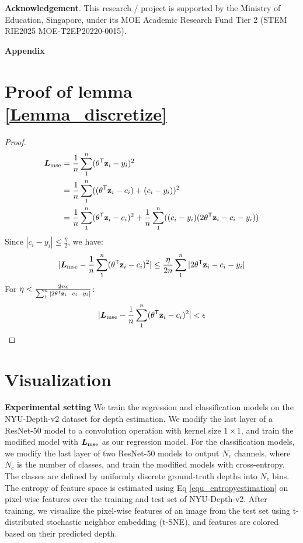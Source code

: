 \documentclass{article} %
\begin{document}
\textbf{Acknowledgement}. This research / project is supported by the Ministry of Education, Singapore, under its MOE Academic Research Fund Tier 2 (STEM RIE2025 MOE-T2EP20220-0015).




\newpage

\renewcommand\thefigure{\Alph{figure}} 
\setcounter{figure}{0}

\textbf{Appendix}
\appendix
\section{Proof of lemma \ref{Lemma_discretize}}
\label{appendix_A}

\begin{proof}
    \begin{align*}
    {\bm{L}}_{\text{mse}} 
    &= \frac{1}{n} \sum_{1}^{n}({\theta}^{{\sf T}}{\bf z}_i - y_i)^{2} \\
    &= \frac{1}{n} \sum_{1}^{n}(({\theta}^{{\sf T}}{\bf z}_i -c_i) + (c_i - y_i))^{2} \\
    &= \frac{1}{n} \sum_{1}^{n}({\theta}^{{\sf T}}{\bf z}_i -c_i)^2 + \frac{1}{n} \sum_{1}^{n}((c_i-y_i)(2{\theta}^{{\sf T}}{\bf z}_i -c_i -y_i)) 
\end{align*}
Since $|c_i - y_i| \leq \frac{\eta}{2}$, we have:
\begin{align*}
    |{\bm{L}}_{\text{mse}} - \frac{1}{n} \sum_{1}^{n}({\theta}^{{\sf T}}{\bf z}_i -c_i)^2| \leq  
    \frac{\eta}{2n} \sum_{1}^{n}|2{\theta}^{{\sf T}}{\bf z}_i -c_i -y_i|
\end{align*}
For $\eta <\frac{2n \epsilon}{\sum_{1}^{n}|2{\theta}^{{\sf T}}{\bf z}_i -c_i -y_i|}$:
\begin{align*}
    |{\bm{L}}_{\text{mse}} - \frac{1}{n} \sum_{1}^{n}({\theta}^{{\sf T}}{\bf z}_i -c_i)^2| < \epsilon
\end{align*}
\end{proof}


\section{Visualization}
\label{appendix_C}

\textbf{Experimental setting}
We train the regression and classification models on the NYU-Depth-v2 dataset for depth estimation. We modify the last layer of a ResNet-50 model to a convolution operation with kernel size $1 \times 1$, and train the modified model with ${\bm{L}}_{\text{mse}}$ as our regression model. For the classification models, we modify the last layer of two ResNet-50 models to output $N_c$ channels, where $N_c$ is the number of classes, and train the modified models with cross-entropy. The classes are defined by uniformly discrete ground-truth depths into $N_c$ bins. The entropy of feature space is estimated using Eq \ref{equ_entropyestimation} on pixel-wise features over the training and test set of NYU-Depth-v2. After training, we visualize the pixel-wise features of an image from the test set using t-distributed stochastic neighbor embedding (t-SNE), and features are colored based on their predicted depth. 
\end{document}

